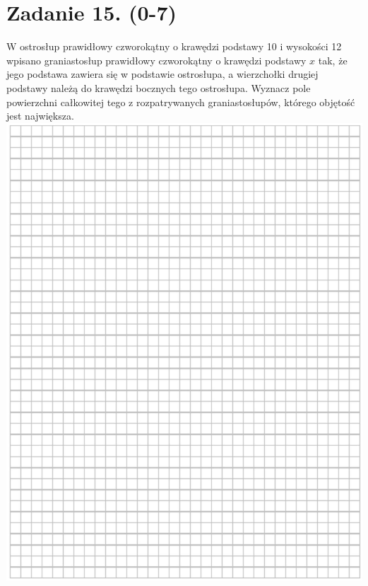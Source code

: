 \documentclass[10pt]{article}
\begin{document}
\section*{Zadanie 15. (0-7)}
W ostrosłup prawidłowy czworokątny o krawędzi podstawy 10 i wysokości 12 wpisano graniastosłup prawidłowy czworokątny o krawędzi podstawy \(x\) tak, że jego podstawa zawiera się w podstawie ostrosłupa, a wierzchołki drugiej podstawy należą do krawędzi bocznych tego ostrosłupa. Wyznacz pole powierzchni całkowitej tego z rozpatrywanych graniastosłupów, którego objętość jest największa.\\
\includegraphics[max width=\textwidth, center]{2024_11_21_49bfa1d51da2e7fce9c5g-15}\\
\end{document}

